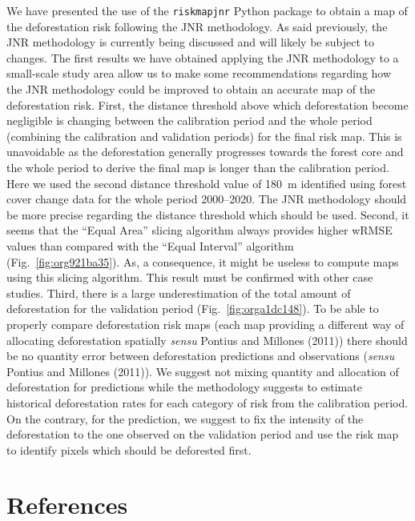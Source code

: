 \documentclass[paper=a4, 12pt, DIV=12]{scrartcl}
\makeatletter
\newcommand{\citeprocitem}[2]{\hyper@linkstart{cite}{citeproc_bib_item_#1}#2\hyper@linkend}
\makeatother
\begin{document}
We have presented the use of the \texttt{riskmapjnr} Python package to obtain a map of the deforestation risk following the JNR methodology. As said previously, the JNR methodology is currently being discussed and will likely be subject to changes. The first results we have obtained applying the JNR methodology to a small-scale study area allow us to make some recommendations regarding how the JNR methodology could be improved to obtain an accurate map of the deforestation risk. First, the distance threshold above which deforestation become negligible is changing between the calibration period and the whole period (combining the calibration and validation periods) for the final risk map. This is unavoidable as the deforestation generally progresses towards the forest core and the whole period to derive the final map is longer than the calibration period. Here we used the second distance threshold value of 180 m identified using forest cover change data for the whole period 2000--2020. The JNR methodology should be more precise regarding the distance threshold which should be used. Second, it seems that the ``Equal Area'' slicing algorithm always provides higher wRMSE values than compared with the ``Equal Interval'' algorithm (Fig. \ref{fig:org921ba35}). As, a consequence, it might be useless to compute maps using this slicing algorithm. This result must be confirmed with other case studies. Third, there is a large underestimation of the total amount of deforestation for the validation period (Fig. \ref{fig:orga1dc148}). To be able to properly compare deforestation risk maps (each map providing a different way of allocating deforestation spatially \emph{sensu} Pontius and Millones (\citeprocitem{3}{2011})) there should be no quantity error between deforestation predictions and observations (\emph{sensu} Pontius and Millones (\citeprocitem{3}{2011})). We suggest not mixing quantity and allocation of deforestation for predictions while the methodology suggests to estimate historical deforestation rates for each category of risk from the calibration period. On the contrary, for the prediction, we suggest to fix the intensity of the deforestation to the one observed on the validation period and use the risk map to identify pixels which should be deforested first. 

\section{References}
\label{sec:org0d6cd55}
\end{document}
